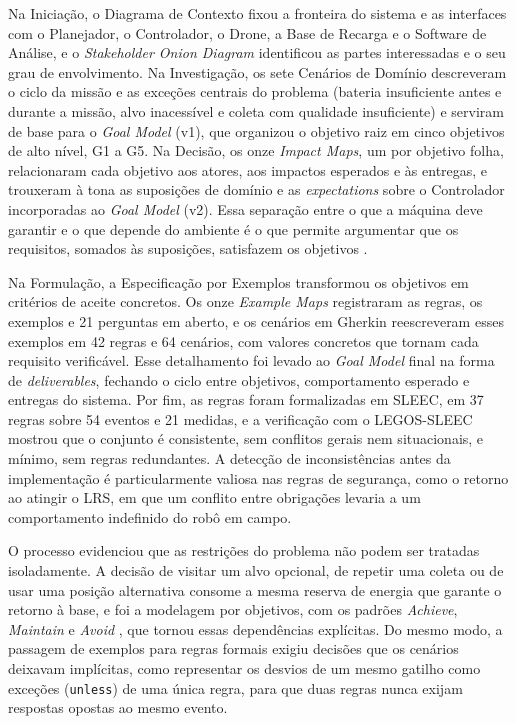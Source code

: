\documentclass[a4paper, 12pt]{article}
\begin{document}
Na Iniciação, o Diagrama de Contexto fixou a fronteira do sistema e as interfaces com o Planejador, o Controlador, o Drone, a Base de Recarga e o Software de Análise, e o \textit{Stakeholder Onion Diagram} identificou as partes interessadas e o seu grau de envolvimento. Na Investigação, os sete Cenários de Domínio descreveram o ciclo da missão e as exceções centrais do problema (bateria insuficiente antes e durante a missão, alvo inacessível e coleta com qualidade insuficiente) e serviram de base para o \textit{Goal Model} (v1), que organizou o objetivo raiz em cinco objetivos de alto nível, G1 a G5. Na Decisão, os onze \textit{Impact Maps}, um por objetivo folha, relacionaram cada objetivo aos atores, aos impactos esperados e às entregas, e trouxeram à tona as suposições de domínio e as \textit{expectations} sobre o Controlador incorporadas ao \textit{Goal Model} (v2). Essa separação entre o que a máquina deve garantir e o que depende do ambiente é o que permite argumentar que os requisitos, somados às suposições, satisfazem os objetivos \cite{letier2020}.

Na Formulação, a Especificação por Exemplos transformou os objetivos em critérios de aceite concretos. Os onze \textit{Example Maps} registraram as regras, os exemplos e 21 perguntas em aberto, e os cenários em Gherkin reescreveram esses exemplos em 42 regras e 64 cenários, com valores concretos que tornam cada requisito verificável. Esse detalhamento foi levado ao \textit{Goal Model} final na forma de \textit{deliverables}, fechando o ciclo entre objetivos, comportamento esperado e entregas do sistema. Por fim, as regras foram formalizadas em SLEEC, em 37 regras sobre 54 eventos e 21 medidas, e a verificação com o LEGOS-SLEEC mostrou que o conjunto é consistente, sem conflitos gerais nem situacionais, e mínimo, sem regras redundantes. A detecção de inconsistências antes da implementação é particularmente valiosa nas regras de segurança, como o retorno ao atingir o LRS, em que um conflito entre obrigações levaria a um comportamento indefinido do robô em campo.

O processo evidenciou que as restrições do problema não podem ser tratadas isoladamente. A decisão de visitar um alvo opcional, de repetir uma coleta ou de usar uma posição alternativa consome a mesma reserva de energia que garante o retorno à base, e foi a modelagem por objetivos, com os padrões \textit{Achieve}, \textit{Maintain} e \textit{Avoid} \cite{lamsweerde2009}, que tornou essas dependências explícitas. Do mesmo modo, a passagem de exemplos para regras formais exigiu decisões que os cenários deixavam implícitas, como representar os desvios de um mesmo gatilho como exceções (\texttt{unless}) de uma única regra, para que duas regras nunca exijam respostas opostas ao mesmo evento.
\end{document}
